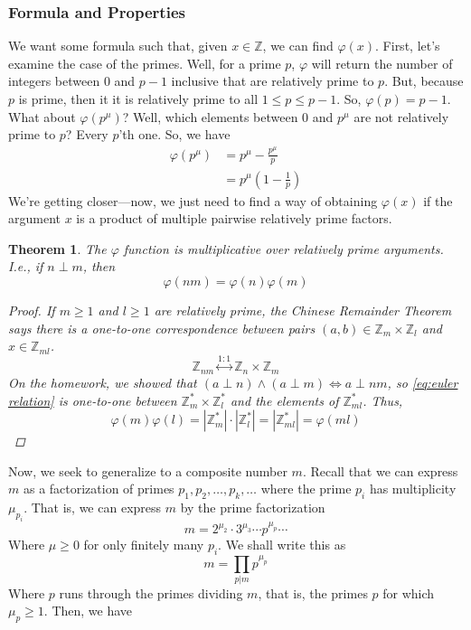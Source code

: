 \documentclass[10pt]{article}
\newcommand\ZZ{{\mathbb Z}}
\newtheorem{theorem}{Theorem}[section]
\theoremstyle{definition}
\begin{document}
\subsubsection{Formula and Properties} 
We want some formula such that, given $x\in\ZZ$, we can find $\varphi(x)$.  First, let's examine the case of the primes.  Well, for a prime $p$, $\varphi$ will return the number of integers between $0$ and $p-1$ inclusive that are relatively prime to $p$.  But, because $p$ is prime, then it it is relatively prime to all $1\leq p \leq p-1$.  So, $\varphi(p) = p-1$.  What about $\varphi(p^\mu)$?  Well, which elements between 0 and $p^\mu$ are not relatively prime to $p$?  Every $p$'th one.  So, we have 
\begin{align*}
\varphi(p^\mu) &= p^\mu - \frac{p^\mu}{p} \\ 
&= p^\mu\left(1-\frac{1}{p}\right)
\end{align*}
We're getting closer---now, we just need to find a way of obtaining $\varphi(x)$ if the argument $x$ is a product of multiple pairwise relatively prime factors.  
\begin{theorem}
The $\varphi$ function is multiplicative over relatively prime arguments.  I.e., if $n\perp m$, then 
\[\varphi(nm) = \varphi(n)\varphi(m)\]
\begin{proof}
If $m\geq 1$ and $l\geq 1$ are relatively prime, the Chinese Remainder Theorem says there is a one-to-one correspondence between pairs $(a,b)\in \ZZ_m\times\ZZ_l$ and $x\in \ZZ_{ml}$.
\begin{equation}
\ZZ_{nm} \overset{1:1}{\longleftrightarrow} \ZZ_n \times \ZZ_m \label{eq:euler relation}
\end{equation}
On the homework, we showed that $(a\perp n)\land(a\perp m) \iff a\perp nm$, so \ref{eq:euler relation} is one-to-one between $\ZZ_m^* \times \ZZ_l^*$ and the elements  of $\ZZ_{ml}^*$.  Thus, 
\[\varphi(m)\varphi(l) = |\ZZ^*_m| \cdot |\ZZ^*_l| = |\ZZ^*_{ml}| = \varphi(ml)\]
\end{proof}
\end{theorem}
Now, we seek to generalize to a composite number $m$.  Recall that we can express $m$ as a factorization of primes $p_1,p_2,\ldots,p_k,\ldots$ where the prime $p_i$ has multiplicity $\mu_{p_i}$.  That is, we can express $m$ by the prime factorization
\[m = 2^{\mu_2} \cdot 3^{\mu_3} \cdots p^{\mu_p} \cdots \] 
Where $\mu \geq 0$ for only finitely many $p_i$.  We shall write this as 
\[ m = \prod_{p|m}p^{\mu_p} \]
Where $p$ runs through the primes dividing $m$, that is, the primes $p$ for which $\mu_{p} \geq 1$.  Then, we have 
\end{document}
